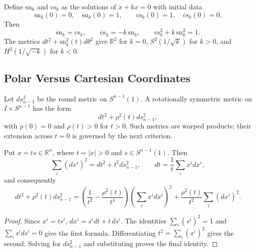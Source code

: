 \begin{definition}
  \label{def:pet-ch1-snk-csk}


  Define $\mathrm{sn}_k$ and $\mathrm{cs}_k$ as the solutions of
  $\ddot x+kx=0$ with initial data
  \[
    \mathrm{sn}_k(0)=0,\quad \dot{\mathrm{sn}}_k(0)=1,
    \qquad
    \mathrm{cs}_k(0)=1,\quad \dot{\mathrm{cs}}_k(0)=0.
  \]
  Then
  \[
    \dot{\mathrm{sn}}_k=\mathrm{cs}_k,\qquad
    \dot{\mathrm{cs}}_k=-k\,\mathrm{sn}_k,\qquad
    \mathrm{cs}_k^2+k\,\mathrm{sn}_k^2=1.
  \]
  The metrics $dt^2+\mathrm{sn}_k^2(t)d\theta^2$ give
  $\mathbb{R}^2$ for $k=0$, $S^2(1/\sqrt{k})$ for $k>0$, and
  $H^2(1/\sqrt{-k})$ for $k<0$.
\end{definition}

\subsection{Polar Versus Cartesian Coordinates}

\begin{definition}
  \label{def:pet-ch1-rot-sym-general}


  Let $ds_{n-1}^2$ be the round metric on $S^{n-1}(1)$. A rotationally
  symmetric metric on $I\times S^{n-1}$ has the form
  \[
    dt^2+\rho^2(t)ds_{n-1}^2,
  \]
  with $\rho(0)=0$ and $\rho(t)>0$ for $t>0$. Such metrics are warped products;
  their extension across $t=0$ is governed by the next criterion.
\end{definition}

\begin{lemma}
  \label{lem:pet-ch1-polar-coordinate-change}


  Put $x=ts\in\mathbb{R}^n$, where $t=|x|>0$ and
  $s\in S^{n-1}(1)$. Then
  \[
    \sum_i(dx^i)^2=dt^2+t^2ds_{n-1}^2,
    \qquad dt=\frac1t\sum_i x^i dx^i,
  \]
  and consequently
  \[
    dt^2+\rho^2(t)ds_{n-1}^2
      =\left(\frac1{t^2}-\frac{\rho^2(t)}{t^4}\right)
         \left(\sum_i x^i dx^i\right)^2
       +\frac{\rho^2(t)}{t^2}\sum_i(dx^i)^2.
  \]
\end{lemma}
\begin{proof}

  \sketch
  Since $x^i=ts^i$,
  $dx^i=s^i dt+t\,ds^i$. The identities
  $\sum_i(s^i)^2=1$ and $\sum_i s^i ds^i=0$ give the first formula.
  Differentiating $t^2=\sum_i(x^i)^2$ gives the second. Solving for
  $ds_{n-1}^2$ and substituting proves the final identity.
\end{proof}

